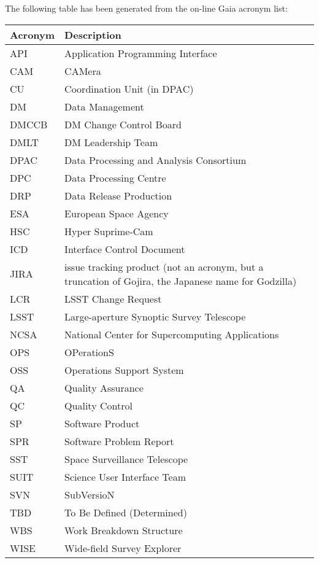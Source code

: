 The following table has been generated from the on-line Gaia acronym list:
\newline\newline%
\addtocounter{table}{-1}
\begin{longtable}{|l|p{}|}\hline 
\textbf{Acronym} & \textbf{Description}  \\\hline
API&Application Programming Interface \\\hline
CAM&CAMera \\\hline
CU&Coordination Unit (in DPAC) \\\hline
DM&Data Management \\\hline
DMCCB&DM Change Control Board \\\hline
DMLT&DM Leadership Team \\\hline
DPAC&Data Processing and Analysis Consortium \\\hline
DPC&Data Processing Centre \\\hline
DRP&Data Release Production \\\hline
ESA&European Space Agency \\\hline
HSC&Hyper Suprime-Cam \\\hline
ICD&Interface Control Document \\\hline
JIRA&issue tracking product (not an acronym, but a truncation of Gojira, the Japanese name for Godzilla) \\\hline
LCR&LSST Change Request \\\hline
LSST&Large-aperture Synoptic Survey Telescope \\\hline
NCSA&National Center for Supercomputing Applications \\\hline
OPS&OPerationS \\\hline
OSS&Operations Support System \\\hline
QA&Quality Assurance \\\hline
QC&Quality Control \\\hline
SP&Software Product \\\hline
SPR&Software Problem Report \\\hline
SST&Space Surveillance Telescope \\\hline
SUIT&Science User Interface Team \\\hline
SVN&SubVersioN \\\hline
TBD&To Be Defined (Determined) \\\hline
WBS&Work Breakdown Structure \\\hline
WISE&Wide-field Survey Explorer \\\hline
\end{longtable} 
